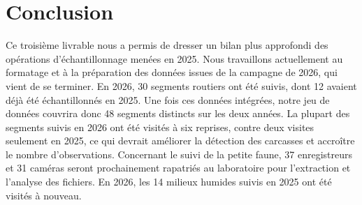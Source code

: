 \section{Conclusion}

Ce troisième livrable nous a permis de dresser un bilan plus approfondi des opérations d'échantillonnage menées en 2025. Nous travaillons actuellement au formatage et à la préparation des données issues de la campagne de 2026, qui vient de se terminer. En 2026, 30 segments routiers ont été suivis, dont 12 avaient déjà été échantillonnés en 2025. Une fois ces données intégrées, notre jeu de données couvrira donc 48 segments distincts sur les deux années. La plupart des segments suivis en 2026 ont été visités à six reprises, contre deux visites seulement en 2025, ce qui devrait améliorer la détection des carcasses et accroître le nombre d'observations. Concernant le suivi de la petite faune, 37 enregistreurs et 31 caméras seront prochainement rapatriés au laboratoire pour l'extraction et l'analyse des fichiers. En 2026, les 14 milieux humides suivis en 2025 ont été visités à nouveau.